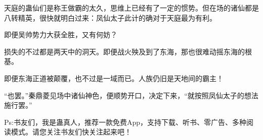 \begin{this_body}
天庭的蛊仙们是称王做霸的太久，思维上已经有了一定的惯势。但在场的诸仙都是八转精英，很快就明白过来：凤仙太子此计的确对于天庭最为有利。

即便吴帅势力大获全胜，又有何妨？

损失的不过都是两天中的洞天。即便战火殃及到了东海，那也很难动摇东海的根基。

即便东海正道被颠覆，也不过是一域而已。人族仍旧是天地间的霸主！

“也罢。”秦鼎菱见场中诸仙神色，便顺势开口，决定下来，“就按照凤仙太子的想法施行罢。”

Ps:书友们，我是蛊真人，推荐一款免费App，支持下载、听书、零广告、多种阅读模式。请您关注书友们快关注起来吧！

\end{this_body}

